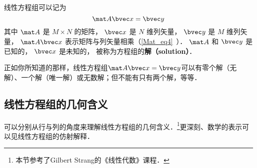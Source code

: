 
\begin{issues}
\issueDraft
\end{issues}


线性方程组可以记为
\begin{equation}\label{LinEq_eq1}
\mat A \bvec x = \bvec y
\end{equation}
其中 $\mat A$ 是 $M \times N$ 的矩阵， $\bvec x$ 是 $N$ 维列矢量， $\bvec y$ 是 $M$ 维列矢量， $\mat A \bvec x$ 表示矩阵与列矢量相乘（\autoref{Mat_eq4}~）． $\mat A$ 和 $\bvec y$ 是已知的， $\bvec x$ 是未知的， 被称为方程组的\textbf{解（solution）}．

正如你所知道的那样，线性方程组$\mat A \bvec x=\bvec y$可以有零个解（无解）、一个解（唯一解）或无数解；但不能有只有两个解，等等．


\subsection{线性方程组的几何含义}\label{LinEq_sub2}
可以分别从行与列的角度来理解线性方程组的几何含义．\footnote{本节参考了Gilbert Strang的《线性代数》课程．}更深刻、数学的表示可以见线性方程组的仿射解释．

